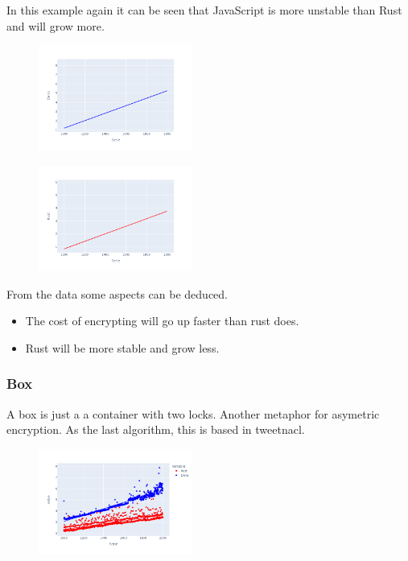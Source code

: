 \documentclass[12pt, letterpaper]{article}
\begin{document}
\begin{multicols}{2}
    In this example again it can be seen that JavaScript is more unstable than Rust and will grow more.

    \begin{figure}[H]
        \centering
        \includegraphics[width=0.45\textwidth]{trend_secretbox_deno}
    \end{figure}

    \begin{figure}[H]
        \centering
        \includegraphics[width=0.45\textwidth]{images/trend_secretbox_rust}
    \end{figure}

    From the data some aspects can be deduced.
    \begin{itemize}
        \item The cost of encrypting will go up faster than rust does.
        \item Rust will be more stable and grow less.
    \end{itemize}

    \subsubsection{Box}

    A box is just a a container with two locks. Another metaphor for asymetric encryption. As the last algorithm, this is based in tweetnacl.

    \begin{figure}[H]
        \centering
        \includegraphics[width=0.45\textwidth]{images/box_lines}
    \end{figure}


\end{multicols}
\end{document}
